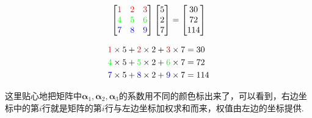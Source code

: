 \documentclass[main.tex]{subfiles}
\begin{document}
\[
    \begin{bmatrix} 
        {\color{red} 1} & {\color{red} 2} & {\color{red} 3} \\ 
        {\color{green} 4} & {\color{green} 5} & {\color{green} 6} \\ 
        {\color{blue} 7} & {\color{blue} 8} & {\color{blue} 9} 
    \end{bmatrix} 
    \begin{bmatrix} 5 \\ 2 \\ 7 \end{bmatrix} = \begin{bmatrix} 30 \\ 72 \\ 114 \end{bmatrix}
\]

\begin{align*}
    {\color{red} 1} \times 5 + {\color{red} 2} \times 2 + {\color{red} 3} \times 7 &= 30 \\
    {\color{green} 4} \times 5 + {\color{green} 5} \times 2 +{\color{green} 6} \times 7 &= 72 \\
    {\color{blue} 7} \times 5 + {\color{blue} 8} \times 2 + {\color{blue} 9}  \times 7 &= 114
\end{align*}

这里贴心地把矩阵中\(\bm\alpha_1,\bm\alpha_2,\bm\alpha_3\)的系数用不同的颜色标出来了，可以看到，右边坐标中的第\(i\)行就是矩阵的第\(i\)行与左边坐标加权求和而来，权值由左边的坐标提供. 

\vspace{1cm}
\end{document}
